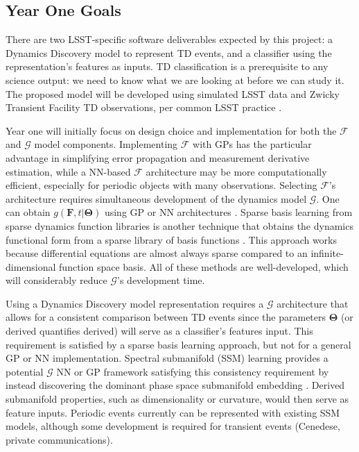 \documentclass[modern]{aastex631}
\begin{document}
\subsection{Year One Goals}
There are two LSST-specific software deliverables expected by this project: a Dynamics Discovery model to represent TD events, and a classifier using the representation's features as inputs. 
TD classification is a prerequisite to any science output: we need to know what we are looking at before we can study it. 
The proposed model will be developed using simulated LSST data and Zwicky Transient Facility TD observations, per common LSST practice \citep{Malz2019,Dekany2020}.

Year one will initially focus on design choice and implementation for both the $\mathcal{F}$ and $\mathcal{G}$ model components. 
Implementing $\mathcal{F}$ with GPs has the particular advantage in simplifying error propagation and measurement derivative estimation, while a NN-based $\mathcal{F}$ architecture may be more computationally efficient, especially for periodic objects with many observations. 
Selecting $\mathcal{F}$'s architecture requires simultaneous development of the dynamics model $\mathcal{G}$. 
One can obtain $g(\mathbf{F},t|\mathbf{\Theta})$ using GP or NN architectures \citep{Raissi2018,Goyal2022}.
Sparse basis learning from sparse dynamics function libraries is another technique that obtains the dynamics functional form from a sparse library of basis functions \citep{Mai2016}. 
This approach works because differential equations are almost always sparse compared to an infinite-dimensional function space basis. 
All of these methods are well-developed, which will considerably reduce $\mathcal{G}$'s development time. 

Using a Dynamics Discovery model representation requires a $\mathcal{G}$ architecture that allows for a consistent comparison between TD events since the parameters $\mathbf{\Theta}$ (or derived quantifies derived) will serve as a classifier's features input. 
This requirement is satisfied by a sparse basis learning approach, but not for a general GP or NN implementation. 
Spectral submanifold (SSM) learning provides a potential $\mathcal{G}$ NN or GP framework satisfying this consistency requirement by instead discovering the dominant phase space submanifold embedding \citep{Cenedese2022}.
Derived submanifold properties, such as dimensionality or curvature, would then serve as feature inputs. 
Periodic events currently can be represented with existing SSM models, although some development is required for transient events (Cenedese, private communications). 
\end{document}
